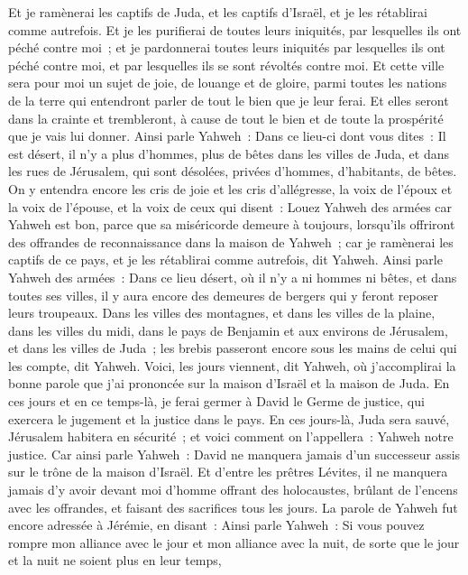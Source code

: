 \begin{multicols}{2}
Et je ramènerai les captifs de Juda, et les captifs d'Israël, et je les rétablirai comme autrefois.
Et je les purifierai de toutes leurs iniquités, par lesquelles ils ont péché contre moi~; et je pardonnerai toutes leurs iniquités par lesquelles ils ont péché contre moi, et par lesquelles ils se sont révoltés contre moi.
Et cette ville sera pour moi un sujet de joie, de louange et de gloire, parmi toutes les nations de la terre qui entendront parler de tout le bien que je leur ferai. Et elles seront dans la crainte et trembleront, à cause de tout le bien et de toute la prospérité que je vais lui donner.
Ainsi parle Yahweh~: Dans ce lieu-ci dont vous dites~: Il est désert, il n'y a plus d'hommes, plus de bêtes dans les villes de Juda, et dans les rues de Jérusalem, qui sont désolées, privées d'hommes, d'habitants, de bêtes.
On y entendra encore les cris de joie et les cris d'allégresse, la voix de l'époux et la voix de l'épouse, et la voix de ceux qui disent~: Louez Yahweh des armées car Yahweh est bon, parce que sa miséricorde demeure à toujours, lorsqu'ils offriront des offrandes de reconnaissance dans la maison de Yahweh~; car je ramènerai les captifs de ce pays, et je les rétablirai comme autrefois, dit Yahweh.
Ainsi parle Yahweh des armées~: Dans ce lieu désert, où il n'y a ni hommes ni bêtes, et dans toutes ses villes, il y aura encore des demeures de bergers qui y feront reposer leurs troupeaux.
Dans les villes des montagnes, et dans les villes de la plaine, dans les villes du midi, dans le pays de Benjamin et aux environs de Jérusalem, et dans les villes de Juda~; les brebis passeront encore sous les mains de celui qui les compte, dit Yahweh.
Voici, les jours viennent, dit Yahweh, où j'accomplirai la bonne parole que j'ai prononcée sur la maison d'Israël et la maison de Juda.
En ces jours et en ce temps-là, je ferai germer à David le Germe de justice, qui exercera le jugement et la justice dans le pays.
En ces jours-là, Juda sera sauvé, Jérusalem habitera en sécurité~; et voici comment on l'appellera~: Yahweh notre justice.
Car ainsi parle Yahweh~: David ne manquera jamais d'un successeur assis sur le trône de la maison d'Israël.
Et d'entre les prêtres Lévites, il ne manquera jamais d'y avoir devant moi d'homme offrant des holocaustes, brûlant de l'encens avec les offrandes, et faisant des sacrifices tous les jours.
La parole de Yahweh fut encore adressée à Jérémie, en disant~:
Ainsi parle Yahweh~: Si vous pouvez rompre mon alliance avec le jour et mon alliance avec la nuit, de sorte que le jour et la nuit ne soient plus en leur temps,

\end{multicols}
